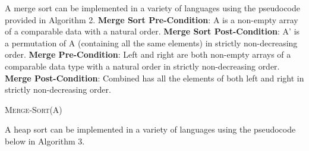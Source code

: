 \documentclass[onecolumn, 12pt, article]{IEEEtran}
\numberwithin{case}{problem}
\numberwithin{condition}{problem}
\numberwithin{condition}{subsection}
\numberwithin{definition}{section}
\theoremstyle{remark}
\numberwithin{question}{problem}
\theoremstyle{plain}
\numberwithin{answer}{problem}
\numberwithin{solution}{section}
\numberwithin{equation}{section}%
\begin{document}
A merge sort can be implemented in a variety of languages using the pseudocode provided in Algorithm 2.
\newline
\textbf{Merge Sort Pre-Condition}: A is a non-empty array of a comparable data with a natural order.
\newline
\textbf{Merge Sort Post-Condition}: A' is a permutation of A (containing all the same elements) in strictly non-decreasing order.
\newline
\textbf{Merge Pre-Condition}: Left and right are both non-empty arrays of a comparable data type with a natural order in strictly non-decreasing order.
\newline
\textbf{Merge Post-Condition}: Combined has all the elements of both left and right in strictly non-decreasing order.
\begin{algorithm}
\caption {\textsc{Merge-Sort}(A)}
\label{algo:mergesort}
\begin{algorithmic}[1]
\EndIf
{}
\EndFor
{}
\EndFor
{}
\EndProcedure
\newline
{}
	\EndIf
	\EndIf
\EndWhile
{}
\EndWhile
{}
\EndWhile
{}
\EndProcedure
\end{algorithmic}
\end{algorithm}
\newline
A heap sort can be implemented in a variety of languages using the pseudocode below in Algorithm 3.
\newline
\end{document}
